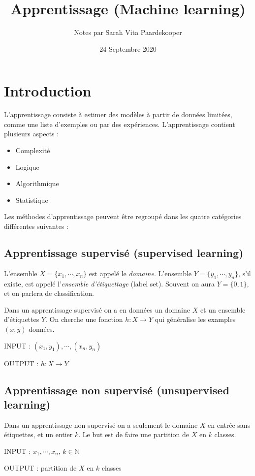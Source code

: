 \documentclass{article}
\title{Apprentissage (Machine learning)}
\date{24 Septembre 2020}
\author{Notes par Sarah Vita Paardekooper}
\theoremstyle{plain}
\theoremstyle{remark}
\theoremstyle{definition}
\begin{document}
\maketitle

\section{Introduction}

L'apprentissage consiste à estimer des modèles à partir de données limitées, comme une liste d'exemples ou par des expériences. 
L'apprentissage contient plusieurs aspects :
\begin{itemize}
    \item Complexité
    \item Logique
    \item Algorithmique
    \item Statistique
\end{itemize}
Les méthodes d'apprentissage peuvent être regroupé dans les quatre catégories différentes suivantes :

\subsection{Apprentissage supervisé (supervised learning)}

L'ensemble $X=\{x_1,\cdots ,x_n\}$ est appelé le \emph{domaine}. L'ensemble $Y=\{y_1, \cdots , y_n \}$, s'il existe, est appelé l'\emph{ensemble d'étiquettage} (label set). Souvent on aura $Y=\{0,1\}$, et on parlera de classification.

Dans un apprentissage supervisé on a en données un domaine $X$ et un ensemble d'étiquettes $Y$. On cherche une fonction $h : X \rightarrow Y$ qui généralise les examples $(x,y)$ données.

INPUT : $(x_1,y_1),\cdots, (x_n, y_n)$

OUTPUT : $h : X\rightarrow Y$

\subsection{Apprentissage non supervisé (unsupervised learning)}

Dans un apprentissage non supervisé on a seulement le domaine $X$ en entrée sans étiquettes, et un entier $k$. Le but est de faire une partition de $X$ en $k$ classes.

INPUT : $x_1, \cdots , x_n$, $k\in \mathbb{N}$

OUTPUT : partition de $X$ en $k$ classes
\end{document}

